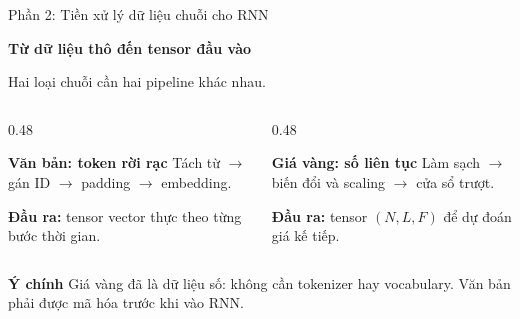 \documentclass[aspectratio=169, 10pt]{beamer}
\begin{document}
\begin{frame}{Phần 2: Tiền xử lý dữ liệu chuỗi cho RNN}
\begin{center}
{\Large\bfseries Từ dữ liệu thô đến tensor đầu vào}\par
\vspace{0.25cm}
\textcolor{slate}{Hai loại chuỗi cần hai pipeline khác nhau.}
\end{center}
\vspace{0.35cm}
\begin{columns}[T]
\begin{column}{0.48\textwidth}
\begin{block}{\textbf{Văn bản: token rời rạc}}
Tách từ $\rightarrow$ gán ID $\rightarrow$ padding $\rightarrow$ embedding.\par
\vspace{0.15cm}
\textbf{Đầu ra:} tensor vector thực theo từng bước thời gian.
\end{block}
\end{column}
\begin{column}{0.48\textwidth}
\begin{exampleblock}{\textbf{Giá vàng: số liên tục}}
Làm sạch $\rightarrow$ biến đổi và scaling $\rightarrow$ cửa sổ trượt.\par
\vspace{0.15cm}
\textbf{Đầu ra:} tensor $(N,L,F)$ để dự đoán giá kế tiếp.
\end{exampleblock}
\end{column}
\end{columns}
\vspace{0.3cm}
\begin{alertblock}{\textbf{Ý chính}}
Giá vàng đã là dữ liệu số: không cần tokenizer hay vocabulary. Văn bản phải được mã hóa trước khi vào RNN.
\end{alertblock}
\end{frame}
\end{document}
